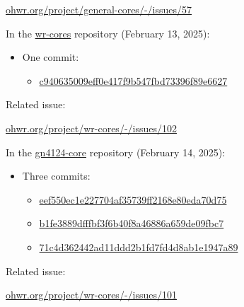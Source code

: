 \vspace{5mm}

\href{https://ohwr.org/project/general-cores/-/issues/57}{ohwr.org/project/general-cores/-/issues/57}

\vspace{5mm}

\noindent In the \href{https://ohwr.org/project/wr-cores/}{wr-cores} repository (February 13, 2025):

\begin{itemize}
\item One commit:
    \begin{itemize}
    \item \href{https://ohwr.org/project/wr-cores/-/commit/c940635009eff0e417f9b547fbd73396f89e6627}{c940635009eff0e417f9b547fbd73396f89e6627}
    \end{itemize}
\end{itemize}

\noindent Related issue:

\vspace{5mm}

\href{https://ohwr.org/project/wr-cores/-/issues/102}{ohwr.org/project/wr-cores/-/issues/102}

\vspace{5mm}

\noindent In the \href{https://ohwr.org/project/gn4124-core/}{gn4124-core} repository (February 14, 2025):

\begin{itemize}
\item Three commits:
    \begin{itemize}
    \item \href{https://ohwr.org/project/gn4124-core/-/commit/eef550ec1e227704af35739ff2168e80eda70d75}{eef550ec1e227704af35739ff2168e80eda70d75}
    \item \href{https://ohwr.org/project/gn4124-core/-/commit/b1fe3889dfffbf3f6b40f8a46886a659de09fbc7}{b1fe3889dfffbf3f6b40f8a46886a659de09fbc7}
    \item \href{https://ohwr.org/project/gn4124-core/-/commit/71c4d362442ad11ddd2b1fd7fd4d8ab1e1947a89}{71c4d362442ad11ddd2b1fd7fd4d8ab1e1947a89}
    \end{itemize}
\end{itemize}

\noindent Related issue:

\vspace{5mm}

\href{https://ohwr.org/project/wr-cores/-/issues/101}{ohwr.org/project/wr-cores/-/issues/101}
